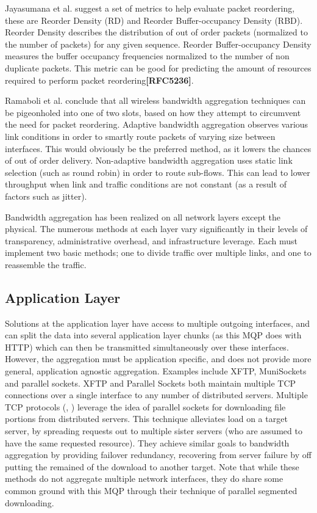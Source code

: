 \documentclass[12pt]{article}
\newcommand{\lcite}[1]
{{\bfseries\color{orange}[#1]}}
\begin{document}
	Jayasumana et al. suggest a set of metrics to help evaluate packet reordering, these are Reorder Density (RD) and Reorder Buffer-occupancy Density (RBD). Reorder Density describes the distribution of out of order packets (normalized to the number of packets) for any given sequence. Reorder Buffer-occupancy Density measures the buffer occupancy frequencies normalized to the number of non duplicate packets. This metric can be good for predicting the amount of resources required to perform packet reordering\lcite{RFC5236}.

	Ramaboli et al. conclude that all wireless bandwidth aggregation techniques can be pigeonholed into one of two slots, based on how they attempt to circumvent the need for packet reordering. Adaptive bandwidth aggregation observes various link conditions in order to smartly route packets of varying size between interfaces. This would obviously be the preferred method, as it lowers the chances of out of order delivery. Non-adaptive bandwidth aggregation uses static link selection (such as round robin) in order to route sub-flows. This can lead to lower throughput when link and traffic conditions are not constant (as a result of factors such as jitter)\cite{Ramaboli20121674}.

	Bandwidth aggregation has been realized on all network layers except the physical. The numerous methods at each layer vary significantly in their levels of transparency, administrative overhead, and infrastructure leverage. Each must implement two basic methods; one to divide traffic over multiple links, and one to reassemble the traffic.

	\subsection{Application Layer}

		Solutions at the application layer have access to multiple outgoing interfaces, and can split the data into several application layer chunks (as this MQP does with HTTP) which can then be transmitted simultaneously over these interfaces. However, the aggregation must be application specific, and does not provide more general, application agnostic aggregation. Examples include XFTP, MuniSockets and parallel sockets. XFTP and Parallel Sockets both maintain multiple TCP connections over a single interface to any number of distributed servers\cite{Ramaboli20121674}. Multiple TCP protocols (\cite{1541208}, \cite{4539690}) leverage the idea of parallel sockets for downloading file portions from distributed servers. This technique alleviates load on a target server, by spreading requests out to multiple sister servers (who are assumed to have the same requested resource). They achieve similar goals to bandwidth aggregation by providing failover redundancy, recovering from server failure by off putting the remained of the download to another target. Note that while these methods do not aggregate multiple network interfaces, they do share some common ground with this MQP through their technique of parallel segmented downloading.
\end{document}
